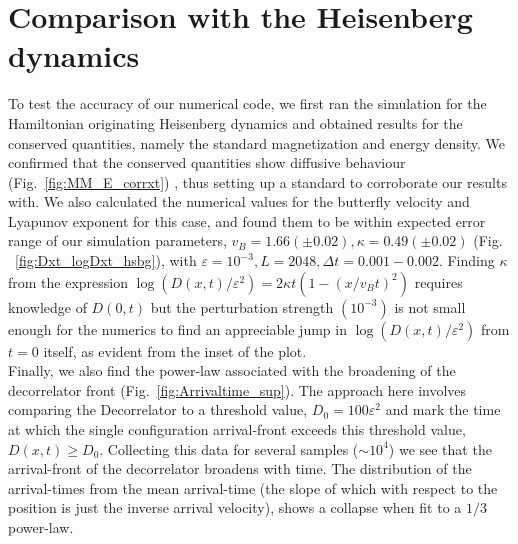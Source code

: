 \documentclass[prl,aps,twocolumn,nosuperscriptaddress,bibnotes,notitlepage,nofootinbib]{revtex4-2}
\begin{document}
\section*{Comparison with the Heisenberg dynamics}
To test the accuracy of our numerical code, we first ran the simulation for the Hamiltonian originating Heisenberg dynamics and obtained results for the conserved quantities, namely the standard magnetization and energy density. We confirmed that the conserved quantities show diffusive behaviour (Fig.~\ref{fig:MM_E_corrxt}) , thus setting up a standard to corroborate our results with. We also calculated the numerical values for the butterfly velocity and Lyapunov exponent for this case, and found them to be within expected error range of our simulation parameters, $v_B = 1.66(\pm 0.02) , \kappa = 0.49 (\pm 0.02)$ (Fig. ~\ref{fig:Dxt_logDxt_hsbg}), with $\varepsilon = 10^{-3}, L = 2048, \Delta t = 0.001-0.002$.  Finding $\kappa$ from the expression $\log(D(x,t)/\varepsilon^2) = 2 \kappa t (1 - (x/v_Bt)^2)$  requires knowledge of $D(0,t)$ but the perturbation strength $(10^{-3})$ is not small enough for the numerics to find an appreciable jump in $\log(D(x,t)/\varepsilon^2)$ from $t=0$ itself, as evident from the inset of the plot.\\ 

Finally, we also find the power-law associated with the broadening of the decorrelator front (Fig.~\ref{fig:Arrivaltime_sup}). The approach here involves comparing the Decorrelator to a threshold value, $D_{0} = 100 \varepsilon^2$ and mark the time at which the single configuration arrival-front exceeds this threshold value, $D(x,t) \geq D_{0}$. 
Collecting this data for several samples ($\sim 10^4$) we see that the arrival-front of the decorrelator broadens with time. The distribution of the arrival-times from the mean arrival-time (the slope of which with respect to the position is just the inverse arrival velocity), shows a collapse when fit to a $1/3$ power-law.
\end{document}
